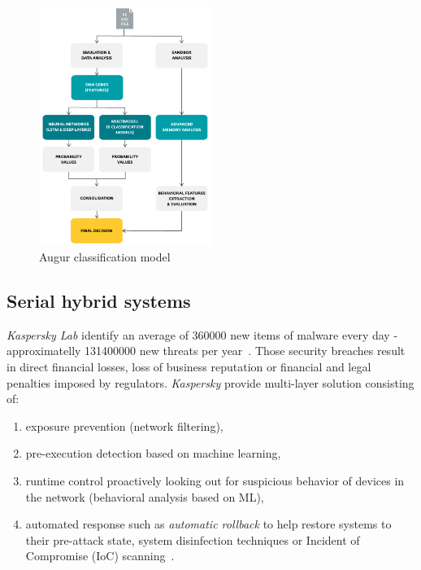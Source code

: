 \begin{figure}[htb]
    \centering
    \includegraphics[width=0.5\textwidth]{imgs/eset_augur.png}
    \caption{Augur classification model~\cite{eset_machine_learning}}
    \label{fig:sim1}
\end{figure}
\FloatBarrier

\subsection{Serial hybrid systems}\label{subsec:serial-hybrid-systems}

\textit{Kaspersky Lab} identify an average of \num{360000} new items of malware every day - approximatelly \num{131400000} new threats per year~\cite{whitepaper:kaspersky_next_generation}.
Those security breaches result in direct financial losses, loss of business reputation or financial and legal penalties imposed by regulators.
\textit{Kaspersky} provide multi-layer solution consisting of:

\begin{enumerate}[label=(\roman*)]
    \item exposure prevention (network filtering),
    \item pre-execution detection based on machine learning,
    \item runtime control proactively looking out for suspicious behavior of devices in the network (behavioral analysis based on ML),
    \item automated response such as \textit{automatic rollback} to help restore systems to their pre-attack state, system disinfection techniques or Incident of Compromise (IoC) scanning~\cite{whitepaper:kaspersky_next_generation}.
\end{enumerate}

